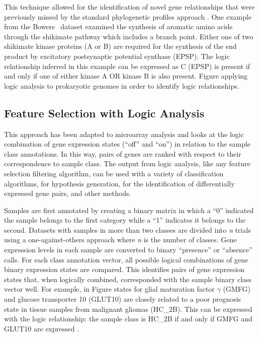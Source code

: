 {This technique allowed for the identification of novel gene relationships that
were previously missed by the standard phylogenetic profiles approach
\cite{PMID_144923264}.  One example from the Bowers \ea\ dataset examined the
synthesis of aromatic amino acids through the shikimate pathway which includes
a branch point.  Either one of two shikimate kinase proteins (A or B) are
required for the synthesis of the end product by excitatory postsynaptic
potential synthase (EPSP). The logic relationship inferred in this example can
be expressed as C (EPSP) is present if and only if one of either kinase A OR
kinase B is also present.  Figure %
applying logic analysis to prokaryotic genomes in order to identify logic
relationships.

\subsection{Feature Selection with Logic Analysis}

This approach has been adapted to microarray analysis and looks at the logic
combination of gene expression states (``off'' and ``on'') in relation to the sample
class annotations.  In this way, pairs of genes are ranked with respect to
their correspondence to sample class.  The output from logic analysis, like any
feature selection filtering algorithm, can be used with a variety of
classification algorithms, for hypothesis generation, for the identification of
differentially expressed gene pairs, and other methods.

Samples are first annotated by creating a binary matrix in which a ``0''
indicated the sample belongs to the first category while a ``1'' indicates it
belongs to the second.  Datasets with samples in more than two classes are
divided into \emph{n} trials using a one-against-others approach where \emph{n}
is the number of classes.  Gene expression levels in each sample are converted
to binary ``presence'' or ``absence'' calls.  For each class annotation vector,
all possible logical combinations of gene binary expression states are
compared.  This identifies pairs of gene expression states that, when logically
combined, corresponded with the sample binary class vector well. For example,
in Figure %
states for glial maturation factor $\gamma$ (GMFG) and glucose transporter 10
(GLUT10) are closely related to a poor prognosis state in tissue samples from
malignant gliomas (HC\_2B). This can be expressed with the logic relationship:
the sample class is HC\_2B if and only if GMFG and GLUT10 are expressed
\cite{PMID_170746732}.

}
